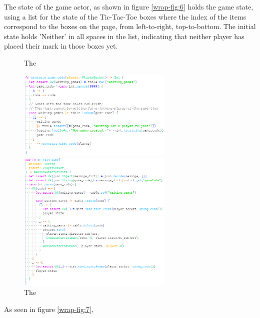 \documentclass[]{project_interim}
\begin{document}
The state of the game actor, as shown in figure \ref{wrap-fig:6}
holds the game state, using a list for the state of the Tic-Tac-Toe boxes
where the index of the items correspond to the boxes on the page, from
left-to-right, top-to-bottom. The initial state holds 'Neither' in
all spaces in the list, indicating that neither player has placed
their mark in those boxes yet.

\begin{figure}
  \caption{The }\label{wrap-fig:7}
  \vspace*{0.5cm}
  \includegraphics[width=20em]{generate_game_code}
  \caption{The }\label{wrap-fig:8}
  \vspace*{0.5cm}
  \includegraphics[width=20em]{join_game}
\end{figure}

As seen in figure \ref{wrap-fig:7},
\end{document}
